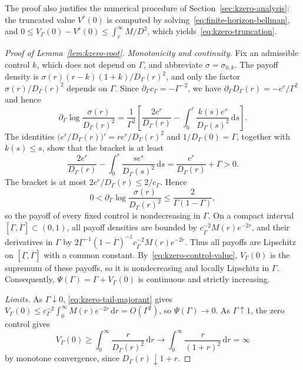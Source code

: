 \documentclass[11pt]{article}
\theoremstyle{definition}
\theoremstyle{remark}
\newcommand{\dd}{\,\mathrm d}
\begin{document}
The proof also justifies the numerical procedure of Section~\ref{sec:kzero-analysis}: the truncated value $V^{\bar r}(0)$ is computed by solving~\eqref{eq:finite-horizon-bellman}, and $0\le V_\Gamma(0)-V^{\bar r}(0)\le\int_{\bar r}^\infty M/D^2$, which yields~\eqref{eq:kzero-truncation}.

\begin{proof}[Proof of Lemma~\ref{lem:kzero-root}]
\emph{Monotonicity and continuity.}
Fix an admissible control $k$, which does not depend on $\Gamma$, and abbreviate $\sigma=\sigma_{0,k}$.
The payoff density is $\sigma(r)(r-k)(1+k)/D_\Gamma(r)^2$, and only the factor $\sigma(r)/D_\Gamma(r)^2$ depends on $\Gamma$.
Since $\partial_\Gamma c_\Gamma=-\Gamma^{-2}$, we have $\partial_\Gamma D_\Gamma(r)=-e^r/\Gamma^2$ and hence
\begin{equation}\label{eq:kzero-parameter-derivative}
 \partial_\Gamma\log\frac{\sigma(r)}{D_\Gamma(r)^2}
 =\frac1{\Gamma^2}
 \left[\frac{2e^r}{D_\Gamma(r)}-\int_0^r\frac{k(s)e^s}{D_\Gamma(s)^2}\dd s\right].
\end{equation}
The identities $\bigl(e^r/D_\Gamma(r)\bigr)'=re^r/D_\Gamma(r)^2$ and $1/D_\Gamma(0)=\Gamma$, together with $k(s)\le s$, show that the bracket is at least
\[
 \frac{2e^r}{D_\Gamma(r)}-\int_0^r\frac{se^s}{D_\Gamma(s)^2}\dd s
 =\frac{e^r}{D_\Gamma(r)}+\Gamma>0.
\]
The bracket is at most $2e^r/D_\Gamma(r)\le2/c_\Gamma$.
Hence
\[
 0<\partial_\Gamma\log\frac{\sigma(r)}{D_\Gamma(r)^2}\le\frac{2}{\Gamma(1-\Gamma)},
\]
so the payoff of every fixed control is nondecreasing in $\Gamma$.
On a compact interval $[\underline\Gamma,\overline\Gamma]\subset(0,1)$, all payoff densities are bounded by $c_{\overline\Gamma}^{-2}M(r)e^{-2r}$, and their derivatives in $\Gamma$ by $2\underline\Gamma^{-1}(1-\overline\Gamma)^{-1}c_{\overline\Gamma}^{-2}M(r)e^{-2r}$.
Thus all payoffs are Lipschitz on $[\underline\Gamma,\overline\Gamma]$ with a common constant.
By~\eqref{eq:kzero-control-value}, $V_\Gamma(0)$ is the supremum of these payoffs, so it is nondecreasing and locally Lipschitz in $\Gamma$.
Consequently, $\Psi(\Gamma)=\Gamma+V_\Gamma(0)$ is continuous and strictly increasing.

\emph{Limits.}
As $\Gamma\downarrow0$, \eqref{eq:kzero-tail-majorant} gives $V_\Gamma(0)\le c_\Gamma^{-2}\int_0^\infty M(r)e^{-2r}\dd r=O(\Gamma^2)$, so $\Psi(\Gamma)\to0$.
As $\Gamma\uparrow1$, the zero control gives
\[
 V_\Gamma(0)\ge\int_0^\infty\frac{r}{D_\Gamma(r)^2}\dd r
 \longrightarrow\int_0^\infty\frac{r}{(1+r)^2}\dd r=\infty
\]
by monotone convergence, since $D_\Gamma(r)\downarrow1+r$.
\end{proof}
\end{document}
